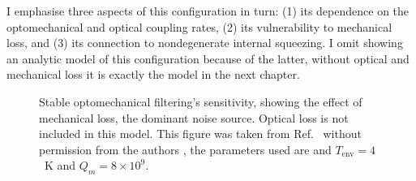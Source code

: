 I emphasise three aspects of this configuration in turn: (1) its dependence on the optomechanical and optical coupling rates, (2) its vulnerability to mechanical loss, and (3) its connection to nondegenerate internal squeezing. I omit showing an analytic model of this configuration because of the latter, without optical and mechanical loss it is exactly the model in the next chapter. %

\begin{figure}
	\centering
	\caption{Stable optomechanical filtering's sensitivity, showing the effect of mechanical loss, the dominant noise source. Optical loss is not included in this model. This figure was taken from Ref.~\cite{} without permission from the authors , the parameters used are  and $T_\text{env}=4$~K and $Q_m=8\times10^9$.}
	\label{fig:sWLC_sensitivity}
\end{figure}

